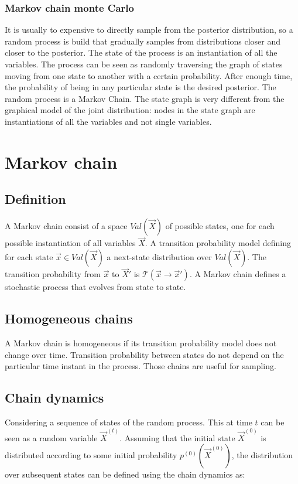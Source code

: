 		\subsubsection{Markov chain monte Carlo}
		It is usually to expensive to directly sample from the posterior distribution, so a random process is build that gradually samples from distributions closer and closer to the posterior.
		The state of the process is an instantiation of all the variables.
		The process can be seen as randomly traversing the graph of states moving from one state to another with a certain probability.
		After enough time, the probability of being in any particular state is the desired posterior.
		The random process is a Markov Chain.
		The state graph is very different from the graphical model of the joint distribution: nodes in the state graph are instantiations of all the variables and not single variables.

\section{Markov chain}

	\subsection{Definition}
	A Markov chain consist of a space $Val(\vec{X})$ of possible states, one for each possible instantiation of all variables $\vec{X}$.
	A transition probability model defining for each state $\vec{x}\in Val(\vec{X})$ a next-state distribution over $Val(\vec{X})$.
	The transition probability from $\vec{x}$ to $\vec{X}'$ is $\mathcal{T}(\vec{x}\rightarrow\vec{x}')$.
	A Markov chain defines a stochastic process that evolves from state to state.

	\subsection{Homogeneous chains}
	A Markov chain is homogeneous if its transition probability model does not change over time.
	Transition probability between states do not depend on the particular time instant in the process.
	Those chains are useful for sampling.

	\subsection{Chain dynamics}
	Considering a sequence of states of the random process.
	This at time $t$ can be seen as a random variable $\vec{X}^{(t)}$.
	Assuming that the initial state $\vec{X}^{(0)}$ is distributed according to some initial probability $p^{(0)}(\vec{X}^{(0)})$, the distribution over subsequent states can be defined using the chain dynamics as:

